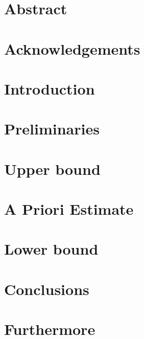 \documentclass[
    paper=a4,
    twoside,
    ]{book}
\begin{document}
\frontmatter 




\chapter{Abstract}
    
    
    
\chapter{Acknowledgements}
    


\tableofcontents


    


\mainmatter


\chapter{Introduction}
    
    
    
\chapter{Preliminaries}
    
    

\chapter{Upper bound}
    
    

\chapter{A Priori Estimate}
    
    

\chapter{Lower bound}
    
    
    
\chapter{Conclusions}
    


\chapter{Furthermore}
    


\appendix
    
    
    
\printbibliography %
    
\end{document}
